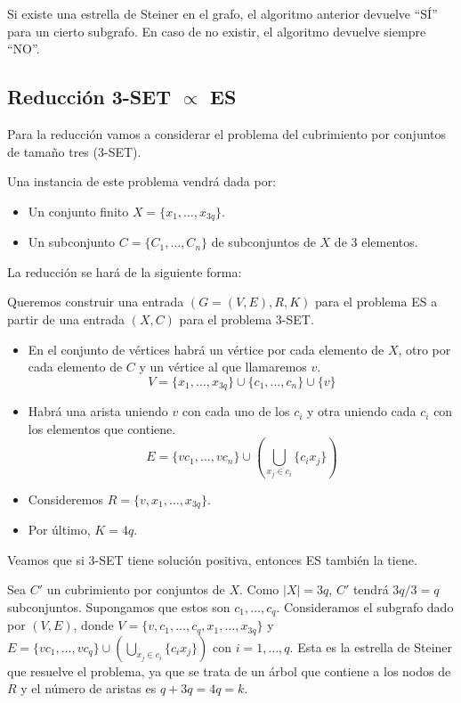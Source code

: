 \documentclass[a4paper, 11pt]{article}
\begin{document}
Si existe una estrella de Steiner en el grafo, el algoritmo anterior devuelve ``SÍ'' para un cierto subgrafo. En caso de no existir, el algoritmo devuelve siempre ``NO''.

\subsection*{Reducción 3-SET $\propto$ ES}
Para la reducción vamos a considerar el problema del cubrimiento por conjuntos de tamaño tres (3-SET).

Una instancia de este problema vendrá dada por:
\begin{itemize}
\item Un conjunto finito $X = \{x_1, \dots, x_{3q}\}$.
\item Un subconjunto $C = \{C_1,\dots,C_n\}$ de subconjuntos de $X$ de 3 elementos.
\end{itemize}

La reducción se hará de la siguiente forma:

Queremos construir una entrada $(G=(V,E),R,K)$ para el problema ES a partir de una entrada $(X,C)$ para el problema 3-SET.

\begin{itemize}
\item En el conjunto de vértices habrá un vértice por cada elemento de $X$, otro por cada elemento de $C$ y un vértice al que llamaremos $v$. $$V= \{x_1,\dots,x_{3q}\} \cup \{c_1,\dots, c_n\} \cup \{v\}$$
\item Habrá una arista uniendo $v$ con cada uno de los $c_i$ y otra uniendo cada $c_i$ con los elementos que contiene. $$E = \{vc_1, \dots, vc_n\} \cup (\bigcup_{x_j \in c_i}\{c_ix_j\})$$
\item Consideremos $R = \{v, x_1, \dots, x_{3q}\}$.
\item Por último, $K = 4q$.
\end{itemize}

Veamos que si 3-SET tiene solución positiva, entonces ES también la tiene.

Sea $C'$ un cubrimiento por conjuntos de $X$. Como $|X| = 3q$, $C'$ tendrá $3q/3 = q$ subconjuntos. Supongamos que estos son $c_1,\dots, c_q$. Consideramos el subgrafo dado por $(V,E)$, donde $V=\{v,c_1,\dots,c_q,x_1,\dots,x_{3q}\}$ y $E=\{vc_1,\dots,vc_q\}\cup(\bigcup_{x_j \in c_i}\{c_ix_j\})$ con $i=1,\dots,q$. Esta es la estrella de Steiner que resuelve el problema, ya que se trata de un árbol que contiene a los nodos de $R$ y el número de aristas es $q+3q = 4q = k$.
\end{document}
